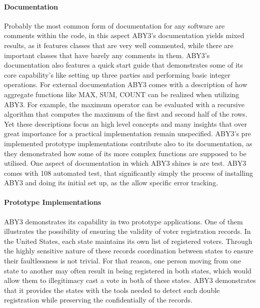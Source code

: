 \paragraph{Documentation} 
Probably the most common form of documentation for any software are comments within the code, in this aspect ABY3's documentation  yields mixed results, as it features classes that are very well commented, while there are important classes that have barely any comments in them. 
ABY3's documentation also features a quick start guide that demonstrates some of its core capability's like setting up three parties and performing basic integer operations.
For external documentation ABY3 comes with a description of how aggregate functions like MAX, SUM, COUNT can be realized when utilizing ABY3. For example, the maximum operator can be evaluated with a recursive algorithm that computes the maximum of the first and second half of the rows. Yet these descriptions focus an high level concepts and many insights that over great importance for a practical implementation remain unspecified. ABY3's pre implemented prototype implementations contribute also to its documentation, as they demonstrated how some of its more complex functions are supposed to be utilised. One aspect of documentation in which ABY3 shines is are test. ABY3 comes with 108 automated test, that significantly simply the process of installing ABY3 and doing its initial set up, as the allow specific error tracking.  
\paragraph{Prototype Implementations}
ABY3 demonstrates its capability in two prototype applications. One of them illustrates the possibility of ensuring the validity of voter registration records. In the United States, each state maintains its own list of registered voters. Through the highly sensitive nature of these records coordination between states to ensure their faultlessness is not trivial. For that reason, one person moving from one state to another may often result in being registered in both states, which would allow them to illegitimacy cast a vote in both of these states.
ABY3 demonstrates that it provides the states with  the tools needed to detect such double registration while preserving the confidentially of the records. 
  


